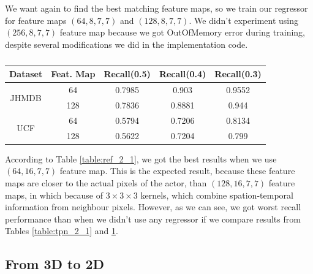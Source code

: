 \documentclass{report}
\begin{document}
We want again to find the best matching feature maps, so we train our regressor for feature maps
$(64,8,7,7)$ and $(128,8,7,7)$. We didn't experiment using $(256,8,7,7)$ feature map because
we got OutOfMemory error during training, despite several modifications we did in the
implementation code.

\begin{table}[h]
  \centering
  \begin{tabular}{||c | c || c  c  c||}
    \hline
    \textbf{Dataset} & \textbf{Feat. Map} & \textbf{Recall(0.5)} & \textbf{Recall(0.4)} & \textbf{Recall(0.3)}\\
    \hline
    \multirow{2}{*}{JHMDB} &  64 & 0.7985 & 0.903 & 0.9552 \\
    \cline{2-5}
    {} & 128 & 0.7836 & 0.8881 & 0.944\\
    \hline
    \multirow{2}{*}{UCF}  & 64 & 0.5794 & 0.7206 & 0.8134 \\
    \cline{2-5}
    {} & 128 & 0.5622 & 0.7204 & 0.799 \\
    \hline

  \end{tabular}
  \caption{}
  \label{table:reg_2_1}
\end{table}

According to Table \ref{table:ref_2_1}, we got the best results when we use $(64,16,7,7)$ feature map. This is the expected result, because these feature maps
are closer to the actual pixels of the actor, than $(128,16,7,7)$ feature maps, in which because of $3 \times 3 \times 3$ kernels, which combine spation-temporal
information from neighbour pixels. However, as we can see, we got worst recall performance than when we didn't use any regressor if we compare results from Tables
\ref{table:tpn_2_1} and \ref{table:reg_2_1}.

\subsection{From 3D to 2D}
\end{document}
